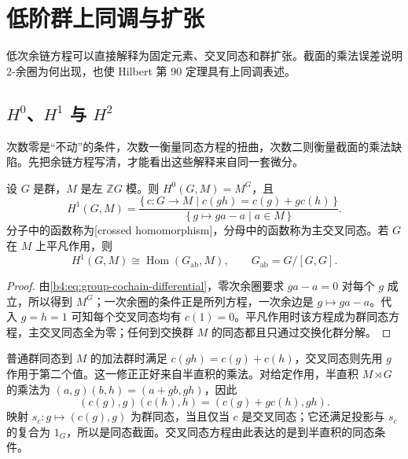 
\section{低阶群上同调与扩张}
\label{b4:sec:1102}

低次余链方程可以直接解释为固定元素、交叉同态和群扩张。截面的乘法误差说明 \(2\)-余圈为何出现，也使 Hilbert 第 90 定理具有上同调表述。

%
%

\subsection{\texorpdfstring{\(H^0\)、\(H^1\) 与 \(H^2\)}{H0、H1 与 H2}}
\label{b4:subsec:1102:01}

次数零是“不动”的条件，次数一衡量同态方程的扭曲，次数二则衡量截面的乘法缺陷。先把余链方程写清，才能看出这些解释来自同一套微分。

\begin{proposition}\label{b4:prop:group-first-cohomology}
	设 \(G\) 是群，\(M\) 是左 \(\mathbb ZG\) 模。则 \(H^0(G,M)=M^G\)，且
	\[
		H^1(G,M)= \frac{\{\,c:G\to M\mid c(gh)=c(g)+g c(h)\,\}} {\{\,g\mapsto ga-a\mid a\in M\,\}}.
	\]
	分子中的函数称为[crossed homomorphism]，分母中的函数称为主交叉同态。若 \(G\) 在 \(M\) 上平凡作用，则
	\[
		H^1(G,M)\cong\operatorname{Hom}(G_{\mathrm{ab}},M), \qquad G_{\mathrm{ab}}=G/[G,G].
	\]
\end{proposition}
\begin{proof}
	由\eqref{b4:eq:group-cochain-differential}，零次余圈要求 \(ga-a=0\) 对每个 \(g\) 成立，所以得到 \(M^G\)；一次余圈的条件正是所列方程，一次余边是 \(g\mapsto ga-a\)。代入 \(g=h=1\) 可知每个交叉同态均有 \(c(1)=0\)。平凡作用时该方程成为群同态方程，主交叉同态全为零；任何到交换群 \(M\) 的同态都且只通过交换化群分解。
\end{proof}

普通群同态到 \(M\) 的加法群时满足 \(c(gh)=c(g)+c(h)\)，交叉同态则先用 \(g\) 作用于第二个值。这一修正正好来自半直积的乘法。对给定作用，半直积 \(M\rtimes G\) 的乘法为 \((a,g)(b,h)=(a+gb,gh)\)，因此
\[
	(c(g),g)(c(h),h)=(c(g)+g c(h),gh).
\]
映射 \(s_c:g\mapsto(c(g),g)\) 为群同态，当且仅当 \(c\) 是交叉同态；它还满足投影与 \(s_c\) 的复合为 \(1_G\)，所以是同态截面。交叉同态方程由此表达的是到半直积的同态条件。

